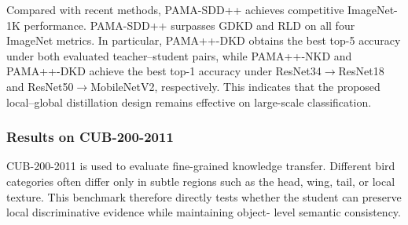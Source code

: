 \documentclass[a4paper,fleqn]{cas-dc}
\begin{document}
Compared with recent methods, PAMA-SDD++ achieves competitive ImageNet-1K
performance. PAMA-SDD++ surpasses GDKD and RLD on all four ImageNet metrics.
In particular, PAMA++-DKD obtains the best top-5 accuracy under both evaluated
teacher--student pairs, while PAMA++-NKD and PAMA++-DKD achieve the best top-1
accuracy under ResNet34$\rightarrow$ResNet18 and
ResNet50$\rightarrow$MobileNetV2, respectively. This indicates that the proposed
local--global distillation design remains effective on large-scale
classification.

\subsubsection{Results on CUB-200-2011}
\label{subsec:cub_results}

CUB-200-2011 is used to evaluate fine-grained knowledge transfer. Different
bird categories often differ only in subtle regions such as the head, wing,
tail, or local texture. This benchmark therefore directly tests whether the
student can preserve local discriminative evidence while maintaining object-
level semantic consistency.
\end{document}
